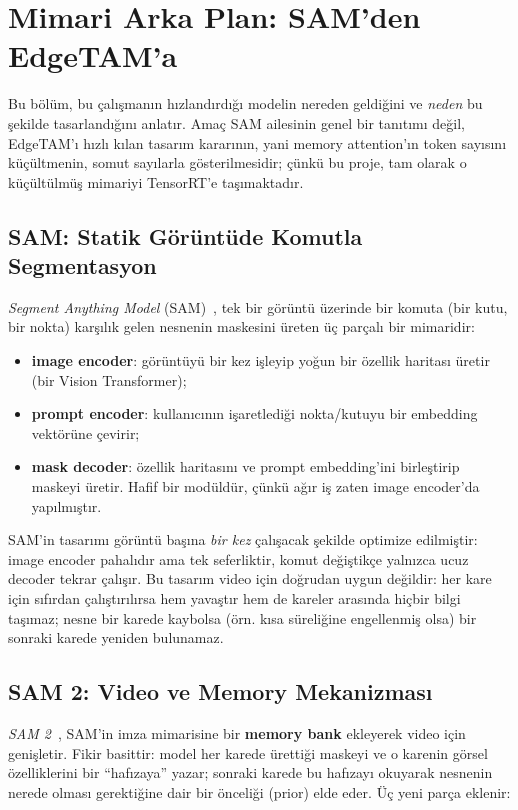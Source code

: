 \chapter{Mimari Arka Plan: SAM'den EdgeTAM'a}
\label{ch:arka-plan}

Bu bölüm, bu çalışmanın hızlandırdığı modelin nereden geldiğini ve
\emph{neden} bu şekilde tasarlandığını anlatır. Amaç SAM ailesinin genel
bir tanıtımı değil, EdgeTAM'ı hızlı kılan tasarım kararının, yani
memory attention'ın token sayısını küçültmenin, somut sayılarla
gösterilmesidir; çünkü bu proje, tam olarak o küçültülmüş mimariyi
TensorRT'e taşımaktadır.

\section{SAM: Statik Görüntüde Komutla Segmentasyon}

\emph{Segment Anything Model} (SAM)~\cite{kirillov2023sam}, tek bir
görüntü üzerinde bir komuta (bir kutu, bir nokta) karşılık gelen nesnenin
maskesini üreten üç parçalı bir mimaridir:

\begin{itemize}
  \item \textbf{image encoder}: görüntüyü bir kez işleyip yoğun bir
        özellik haritası üretir (bir Vision Transformer);
  \item \textbf{prompt encoder}: kullanıcının işaretlediği nokta/kutuyu
        bir embedding vektörüne çevirir;
  \item \textbf{mask decoder}: özellik haritasını ve prompt embedding'ini
        birleştirip maskeyi üretir. Hafif bir modüldür, çünkü ağır iş
        zaten image encoder'da yapılmıştır.
\end{itemize}

SAM'in tasarımı görüntü başına \emph{bir kez} çalışacak şekilde
optimize edilmiştir: image encoder pahalıdır ama tek seferliktir,
komut değiştikçe yalnızca ucuz decoder tekrar çalışır. Bu tasarım
video için doğrudan uygun değildir: her kare için sıfırdan
çalıştırılırsa hem yavaştır hem de kareler arasında hiçbir bilgi
taşımaz; nesne bir karede kaybolsa (örn. kısa süreliğine engellenmiş
olsa) bir sonraki karede yeniden bulunamaz.

\section{SAM 2: Video ve Memory Mekanizması}
\label{sec:sam2-bellek}

\emph{SAM 2}~\cite{ravi2024sam2}, SAM'in imza mimarisine bir
\textbf{memory bank} ekleyerek video için genişletir. Fikir basittir:
model her karede ürettiği maskeyi ve o karenin görsel özelliklerini bir
``hafızaya'' yazar; sonraki karede bu hafızayı okuyarak nesnenin nerede
olması gerektiğine dair bir önceliği (prior) elde eder. Üç yeni parça
eklenir:

